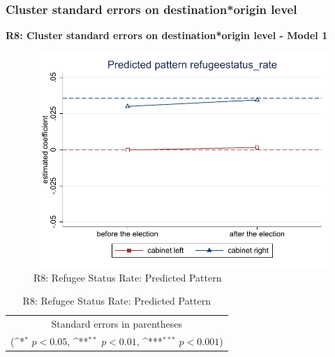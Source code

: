 \documentclass[10pt,a4paper]{scrartcl}
\begin{document}


\clearpage
\FloatBarrier
\subsubsection{Cluster standard errors on destination*origin level}
\textbf{R8: Cluster standard errors on destination*origin level - Model 1}
\begin{figure}[!ht]
	\centering
	\includegraphics[width=1\textwidth]{figures_edited/refugeestatus_rate_graph1_R8.pdf}
	\caption{R8: Refugee Status Rate: Predicted Pattern}
\end{figure}

\begin{table}[!ht]\centering
	\renewcommand{\arraystretch}{1.25}
	\def\sym#1{\ifmmode^{#1}\else\(^{#1}\)\fi}
	\caption{R8: Refugee Status Rate: Predicted Pattern}
	\begin{tabular}{l*{2}{c}}
		\hline\hline
		
		\hline\hline
		\multicolumn{3}{c}{\footnotesize Standard errors in parentheses} \\
		\multicolumn{3}{c}{\footnotesize (\sym{*} \(p<0.05\), \sym{**} \(p<0.01\), \sym{***} \(p<0.001\))}\\
	\end{tabular}
\end{table}
\end{document}
